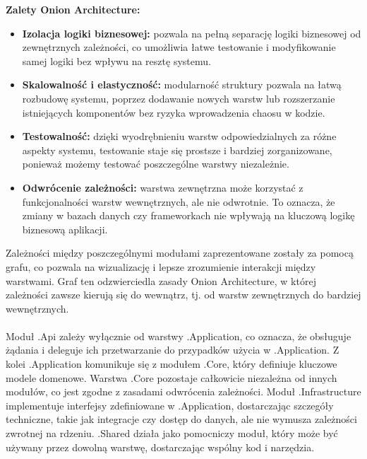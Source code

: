 \documentclass[12pt,a4paper]{article}
\begin{document}
\noindent \textbf{Zalety Onion Architecture:}
\begin{itemize}
    \item \textbf{Izolacja logiki biznesowej:} pozwala na pełną separację logiki biznesowej od zewnętrznych zależności, co umożliwia łatwe testowanie i modyfikowanie samej logiki bez wpływu na resztę systemu.
    \item \textbf{Skalowalność i elastyczność:} modularność struktury pozwala na łatwą rozbudowę systemu, poprzez dodawanie nowych warstw lub rozszerzanie istniejących komponentów bez ryzyka wprowadzenia chaosu w kodzie.
    \item \textbf{Testowalność:} dzięki wyodrębnieniu warstw odpowiedzialnych za różne aspekty systemu, testowanie staje się prostsze i bardziej zorganizowane, ponieważ możemy testować poszczególne warstwy niezależnie.
    \item \textbf{Odwrócenie zależności:} warstwa zewnętrzna może korzystać z funkcjonalności warstw wewnętrznych, ale nie odwrotnie. To oznacza, że zmiany w bazach danych czy frameworkach nie wpływają na kluczową logikę biznesową aplikacji.
\end{itemize}

\newpage

\noindent
Zależności między poszczególnymi modułami zaprezentowane zostały za pomocą grafu, co pozwala na wizualizację i lepsze zrozumienie interakcji między warstwami. Graf ten odzwierciedla zasady Onion Architecture, w której zależności zawsze kierują się do wewnątrz, tj. od warstw zewnętrznych do bardziej wewnętrznych.
\\\\
Moduł .Api zależy wyłącznie od warstwy .Application, co oznacza, że obsługuje żądania i deleguje ich przetwarzanie do przypadków użycia w .Application. Z kolei .Application komunikuje się z modułem .Core, który definiuje kluczowe modele domenowe. Warstwa .Core pozostaje całkowicie niezależna od innych modułów, co jest zgodne z zasadami odwrócenia zależności. Moduł .Infrastructure implementuje interfejsy zdefiniowane w .Application, dostarczając szczegóły techniczne, takie jak integracje czy dostęp do danych, ale nie wymusza zależności zwrotnej na rdzeniu. .Shared działa jako pomocniczy moduł, który może być używany przez dowolną warstwę, dostarczając wspólny kod i narzędzia.
\end{document}
